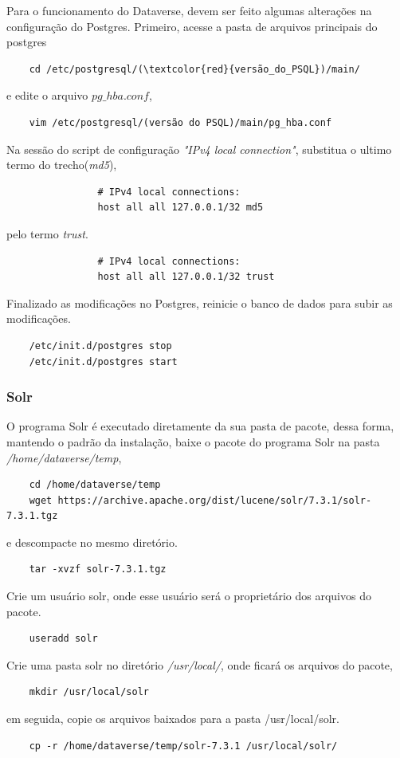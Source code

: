\documentclass[12pt,hidelinks]{article}
\begin{document}
        Para o funcionamento do Dataverse, devem ser feito algumas alterações na \\configuração do Postgres. Primeiro, acesse a pasta de arquivos principais do postgres
        \begin{verbatim} 
    cd /etc/postgresql/(\textcolor{red}{versão_do_PSQL})/main/
        \end{verbatim}
        e edite o arquivo $pg \_ hba.conf$,
         \begin{verbatim}
    vim /etc/postgresql/(versão do PSQL)/main/pg_hba.conf
        \end{verbatim}
        Na sessão do script de configuração \textit{"IPv4 local connection"}, substitua o ultimo termo do trecho(\textit{md5}),
        \begin{verbatim} 
                # IPv4 local connections:
                host all all 127.0.0.1/32 md5
        \end{verbatim}
        pelo termo \textit{trust}.
        \begin{verbatim} 
                # IPv4 local connections:
                host all all 127.0.0.1/32 trust
        \end{verbatim}
        
        Finalizado as modificações no Postgres, reinicie o banco de dados para subir as modificações.
        \begin{verbatim}
    /etc/init.d/postgres stop
    /etc/init.d/postgres start
        \end{verbatim}
        
        \subsubsection{Solr}
        
        \qquad O programa Solr é executado diretamente da sua pasta de pacote, dessa forma, mantendo o padrão da instalação, baixe o pacote do programa Solr na pasta \textit{/home/dataverse/temp},
         \begin{verbatim}
    cd /home/dataverse/temp
    wget https://archive.apache.org/dist/lucene/solr/7.3.1/solr-7.3.1.tgz
        \end{verbatim}
        e descompacte no mesmo diretório.
       \begin{verbatim}
    tar -xvzf solr-7.3.1.tgz
        \end{verbatim}
        
        Crie um usuário solr, onde esse usuário será o proprietário dos arquivos do pacote.
        \begin{verbatim}
    useradd solr
        \end{verbatim}
        Crie uma pasta solr no diretório \textit{/usr/local/}, onde ficará os arquivos do pacote,
        \begin{verbatim}
    mkdir /usr/local/solr
        \end{verbatim}
        em seguida, copie os arquivos baixados para a pasta /usr/local/solr.
        \begin{verbatim}
    cp -r /home/dataverse/temp/solr-7.3.1 /usr/local/solr/
        \end{verbatim}
\end{document}
